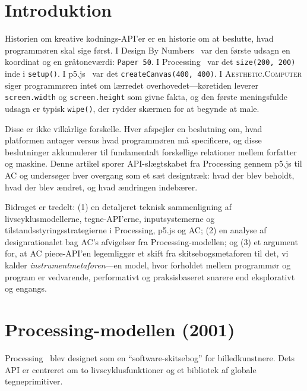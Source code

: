 \documentclass[10pt,letterpaper,twocolumn]{article}
\newcommand{\ac}{\textsc{Aesthetic.Computer}}
\begin{document}

\section{Introduktion}

Historien om kreative kodnings-API'er er en historie om at beslutte, hvad programmøren skal sige først. I Design By Numbers~\citep{maeda2001dbn} var den første udsagn en koordinat og en gråtoneværdi: \texttt{Paper 50}. I Processing~\citep{reas2003processing} var det \texttt{size(200, 200)} inde i \texttt{setup()}. I p5.js~\citep{mccarthy2015p5js} var det \texttt{createCanvas(400, 400)}. I \ac{} siger programmøren intet om lærredet overhovedet---køretiden leverer \texttt{screen.width} og \texttt{screen.height} som givne fakta, og den første meningsfulde udsagn er typisk \texttt{wipe()}, der rydder skærmen for at begynde at male.

Disse er ikke vilkårlige forskelle. Hver afspejler en beslutning om, hvad platformen antager versus hvad programmøren må specificere, og disse beslutninger akkumulerer til fundamentalt forskellige relationer mellem forfatter og maskine. Denne artikel sporer API-slægtskabet fra Processing gennem p5.js til AC og undersøger hver overgang som et sæt designtræk: hvad der blev beholdt, hvad der blev ændret, og hvad ændringen indebærer.

Bidraget er tredelt: (1) en detaljeret teknisk sammenligning af livscyklusmodellerne, tegne-API'erne, inputsystemerne og tilstandsstyringsstrategierne i Processing, p5.js og AC; (2) en analyse af designrationalet bag AC's afvigelser fra Processing-modellen; og (3) et argument for, at AC piece-API'en legemliggør et skift fra skitsebogsmetaforen til det, vi kalder \emph{instrumentmetaforen}---en model, hvor forholdet mellem programmør og program er vedvarende, performativt og praksisbaseret snarere end eksplorativt og engangs.


\section{Processing-modellen (2001)}
\label{sec:processing}

Processing~\citep{reas2007processing} blev designet som en ``software-skitsebog'' for billedkunstnere. Dets API er centreret om to livscyklusfunktioner og et bibliotek af globale tegneprimitiver.
\end{document}
